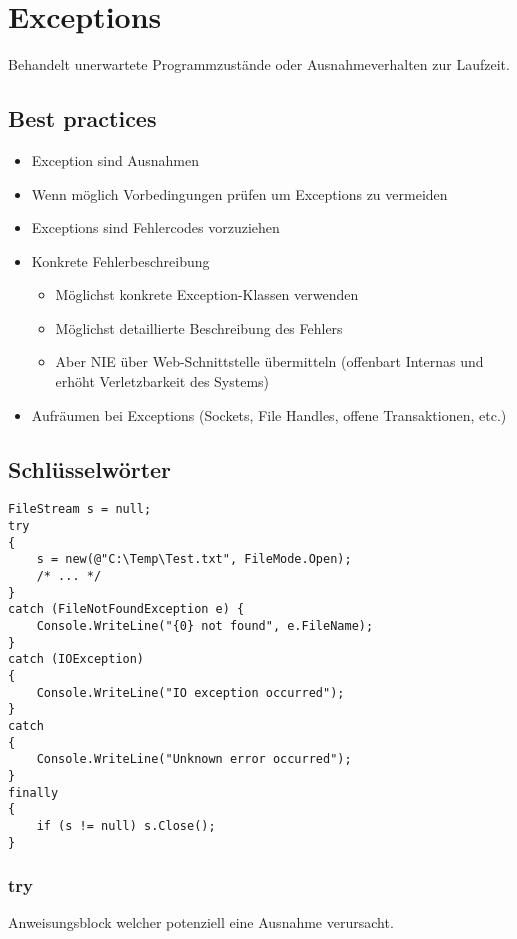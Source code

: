 \section{Exceptions}

\begin{multicols*}{2}
Behandelt unerwartete Programmzustände oder Ausnahmeverhalten zur Laufzeit.
\subsection{Best practices}
\begin{itemize}
    \item Exception sind Ausnahmen
    \item Wenn möglich Vorbedingungen prüfen um Exceptions zu vermeiden
    \item Exceptions sind Fehlercodes vorzuziehen
    \item Konkrete Fehlerbeschreibung 
    \begin{itemize}
        \item Möglichst konkrete Exception-Klassen verwenden
        \item Möglichst detaillierte Beschreibung des Fehlers
        \item Aber NIE über Web-Schnittstelle übermitteln (offenbart Internas und erhöht Verletzbarkeit des Systems)
    \end{itemize}
    \item Aufräumen bei Exceptions (Sockets, File Handles, offene Transaktionen, etc.)
\end{itemize}

\subsection{Schlüsselwörter}
\begin{lstlisting}
FileStream s = null; 
try
{
    s = new(@"C:\Temp\Test.txt", FileMode.Open);
    /* ... */
}
catch (FileNotFoundException e) {
    Console.WriteLine("{0} not found", e.FileName);
}
catch (IOException)
{
    Console.WriteLine("IO exception occurred");
}
catch
{
    Console.WriteLine("Unknown error occurred");
}
finally 
{
    if (s != null) s.Close();
}
\end{lstlisting}
\subsubsection{try}
Anweisungsblock welcher potenziell eine Ausnahme verursacht.

\end{multicols*}

